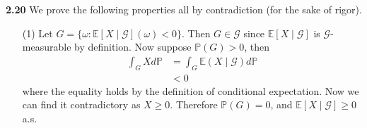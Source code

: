 \noindent\textbf{2.20} We prove the following properties all by contradiction (for the sake of rigor).
\begin{enumerate}
    \item[(1)] Let $G = \{\omega: \mathbb{E}[X \mid \mathcal{G}](\omega) < 0 \}$.
    Then $G \in \mathcal{G}$ since $\mathbb{E}[X \mid \mathcal{G}]$ is $\mathcal{G}$-measurable by definition.
    Now suppose $\mathbb{P}(G) > 0$, then
    \begin{equation}
        \begin{split}
            \int_{G} X d \mathbb{P}
            &= \int_{G} \mathbb{E}(X \mid \mathcal{G}) d \mathbb{P} \\
            &< 0
        \end{split}
    \end{equation}
    where the equality holds by the definition of conditional expectation.
    Now we can find it contradictory as $X \geq 0$.
    Therefore $\mathbb{P}(G) = 0$, and $\mathbb{E}[X \mid \mathcal{G}] \geq 0$ a.s.


\end{enumerate}
